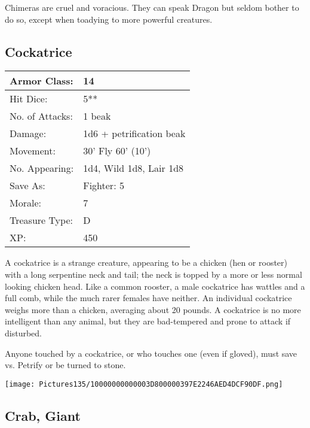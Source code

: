 \documentclass[a4paper,twoside,openany,10pt]{book}
\begin{document}
\begin{multicols}{2}
Chimeras are cruel and voracious. They can speak Dragon but seldom bother to do so, except when toadying to more powerful creatures.

\subsection*{Cockatrice}\label{cockatrice}


\begin{tabularx}{0.48\textwidth}{@{}lX@{}}
Armor Class: & 14 \\\hline
Hit Dice: & 5** \\\hline
No. of Attacks: & 1 beak \\\hline
Damage: & 1d6 + petrification beak \\\hline
Movement: & 30' Fly 60'
(10') \\\hline
No. Appearing: & 1d4, Wild 1d8, Lair 1d8 \\\hline
Save As: & Fighter: 5 \\\hline
Morale: & 7 \\\hline
Treasure Type: & D \\\hline
XP: & 450 \\\hline
\end{tabularx}\medskip

A cockatrice is a strange creature, appearing to be a chicken (hen or rooster) with a long serpentine neck and tail; the neck is topped by a more or less normal looking chicken head. Like a common rooster, a male cockatrice has wattles and a full comb, while the much rarer females have neither. An individual cockatrice weighs more than a chicken, averaging about 20 pounds. A cockatrice is no more intelligent than any animal, but they are bad-tempered and prone to attack if disturbed.

Anyone touched by a cockatrice, or who touches one (even if gloved), must save vs. Petrify or be turned to stone.

\begin{center}
	\texttt{[image: Pictures135/10000000000003D800000397E2246AED4DCF90DF.png]}
\end{center}


\subsection*{Crab, Giant}\label{crab-giant}


\end{multicols}
\end{document}
